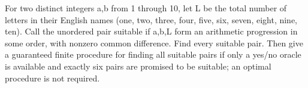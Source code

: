 For two distinct integers a,b from 1 through 10, let L be the total number of letters in their English names (one, two, three, four, five, six, seven, eight, nine, ten). Call the unordered pair suitable if a,b,L form an arithmetic progression in some order, with nonzero common difference. Find every suitable pair. Then give a guaranteed finite procedure for finding all suitable pairs if only a yes/no oracle is available and exactly six pairs are promised to be suitable; an optimal procedure is not required.
